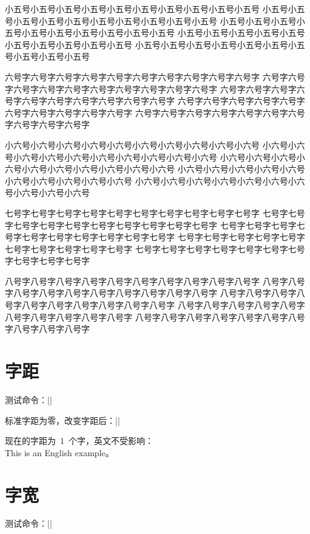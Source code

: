 \documentclass[cs4size,a4paper,fancyhdr,fntef,UTF8,winfonts]{ctexbook}
\begin{document}
小五号小五号小五号小五号小五号小五号小五号小五号小五号小五号
小五号小五号小五号小五号小五号小五号小五号小五号小五号小五号
小五号小五号小五号小五号小五号小五号小五号小五号小五号小五号
小五号小五号小五号小五号小五号小五号小五号小五号小五号小五号
小五号小五号小五号小五号小五号小五号小五号小五号小五号小五号

六号字六号字六号字六号字六号字六号字六号字六号字六号字六号字
六号字六号字六号字六号字六号字六号字六号字六号字六号字六号字
六号字六号字六号字六号字六号字六号字六号字六号字六号字六号字
六号字六号字六号字六号字六号字六号字六号字六号字六号字六号字
六号字六号字六号字六号字六号字六号字六号字六号字六号字六号字

小六号小六号小六号小六号小六号小六号小六号小六号小六号小六号
小六号小六号小六号小六号小六号小六号小六号小六号小六号小六号
小六号小六号小六号小六号小六号小六号小六号小六号小六号小六号
小六号小六号小六号小六号小六号小六号小六号小六号小六号小六号
小六号小六号小六号小六号小六号小六号小六号小六号小六号小六号

七号字七号字七号字七号字七号字七号字七号字七号字七号字七号字
七号字七号字七号字七号字七号字七号字七号字七号字七号字七号字
七号字七号字七号字七号字七号字七号字七号字七号字七号字七号字
七号字七号字七号字七号字七号字七号字七号字七号字七号字七号字
七号字七号字七号字七号字七号字七号字七号字七号字七号字七号字

八号字八号字八号字八号字八号字八号字八号字八号字八号字八号字
八号字八号字八号字八号字八号字八号字八号字八号字八号字八号字
八号字八号字八号字八号字八号字八号字八号字八号字八号字八号字
八号字八号字八号字八号字八号字八号字八号字八号字八号字八号字
八号字八号字八号字八号字八号字八号字八号字八号字八号字八号字

\normalsize

\section{字距}

测试命令：|\ziju| 

标准字距为零，改变字距后：||

{
现在的字距为~1~个字，英文不受影响：\\
This is an English example。
}

\section{字宽}

测试命令：|\ccwd| 
\end{document}

